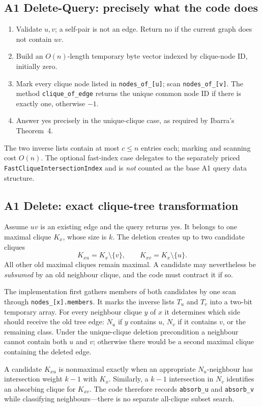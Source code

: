 \subsection{A1 Delete-Query: precisely what the code does}
\begin{enumerate}[leftmargin=*]
\item Validate \(u,v\); a self-pair is not an edge.  Return \textsf{no} if the current graph does not contain \(uv\).
\item Build an \(O(n)\)-length temporary byte vector indexed by clique-node ID, initially zero.
\item Mark every clique node listed in \texttt{nodes\_of\_[u]}; scan \texttt{nodes\_of\_[v]}.  The method \texttt{clique\_of\_edge} returns the unique common node ID if there is exactly one, otherwise \(-1\).
\item Answer \textsf{yes} precisely in the unique-clique case, as required by Ibarra's Theorem~4.
\end{enumerate}
The two inverse lists contain at most \(c\le n\) entries each; marking and scanning cost \(O(n)\).  The optional fast-index case delegates to the separately priced \texttt{FastCliqueIntersectionIndex} and is \emph{not} counted as the base A1 query data structure.

\subsection{A1 Delete: exact clique-tree transformation}
Assume \(uv\) is an existing edge and the query returns \textsf{yes}.  It belongs to one maximal clique \(K_x\), whose size is \(k\).  The deletion creates up to two candidate cliques
\[
K_{xu}=K_x\setminus\{v\},\qquad K_{xv}=K_x\setminus\{u\}.
\]
All other old maximal cliques remain maximal.  A candidate may nevertheless be \emph{subsumed} by an old neighbour clique, and the code must contract it if so.

The implementation first gathers members of both candidates by one scan through \texttt{nodes\_[x].members}.  It marks the inverse lists \(T_u\) and \(T_v\) into a two-bit temporary array.  For every neighbour clique \(y\) of \(x\) it determines which side should receive the old tree edge: \(N_u\) if \(y\) contains \(u\), \(N_v\) if it contains \(v\), or the remaining class.  Under the unique-clique deletion precondition a neighbour cannot contain both \(u\) and \(v\); otherwise there would be a second maximal clique containing the deleted edge.

A candidate \(K_{xu}\) is nonmaximal exactly when an appropriate \(N_u\)-neighbour has intersection weight \(k-1\) with \(K_x\).  Similarly, a \(k-1\) intersection in \(N_v\) identifies an absorbing clique for \(K_{xv}\).  The code therefore records \texttt{absorb\_u} and \texttt{absorb\_v} while classifying neighbours---there is no separate all-clique subset search.

